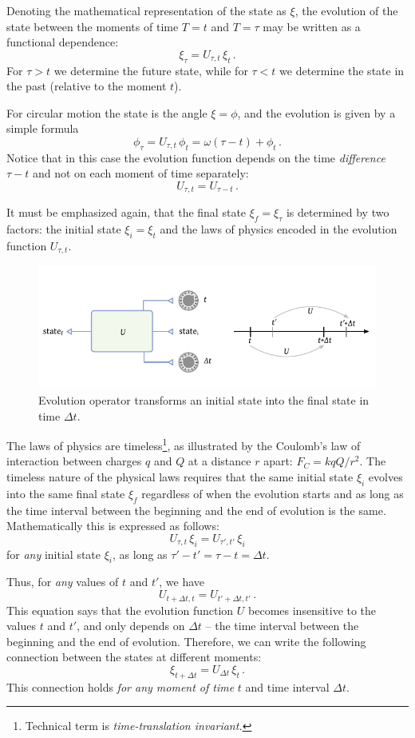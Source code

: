 Denoting the mathematical representation of the state as $\xi$, the evolution of the state between the moments of time $T=t$ and $T=\tau$ may be written as a functional dependence:
\[
\xi_\tau = U_{\tau, t}\,\xi_t\,.
\]
For $\tau > t$ we determine the future state, while for $\tau < t$ we determine the state in the past (relative to the moment $t$).
\begin{myExample}
	For circular motion the state is the angle $\xi=\phi$, and the evolution is given by a simple formula
	\[
	\phi_\tau = U_{\tau, t}\,\phi_t=\omega (\tau - t) + \phi_t\,.	
	\]
	Notice that in this case the evolution function depends on the time \emph{difference} $\tau-t$ and not on each moment of time separately:
	\[
	U_{\tau, t} = U_{\tau-t}\,.
	\]
\end{myExample}
It must be emphasized again, that the final state $\xi_f=\xi_\tau$ is determined by two factors: the initial state $\xi_i=\xi_t$ and the laws of physics encoded in the evolution function $U_{\tau, t}$. 

\begin{figure}[htbp]
	\centering
	\includegraphics[scale=1.0]{evolutionOperatorBox}
	\caption{Evolution operator transforms an initial state into the final state in time $\Delta t$.}
	\label{fig:evolutionOperatorBox}
\end{figure}

The laws of physics are timeless\footnote{Technical term is \emph{time-translation invariant.}}, as illustrated by the Coulomb's law of interaction between charges $q$ and $Q$ at a distance $r$ apart: $F_C=k qQ/r^2$. The timeless nature of the physical laws requires that the same initial state $\xi_i$ evolves into the same final state $\xi_f$ regardless of when the evolution starts and as long as the time interval between the beginning and the end of evolution is the same. Mathematically this is expressed as follows:
\[
U_{\tau, t}\,\xi_i  = U_{\tau', t'}\,\xi_i
\]
for \emph{any} initial state $\xi_i$, as long as $\tau'-t'=\tau-t=\Delta t$.

Thus, for \emph{any} values of $t$ and $t'$, we have
\[
U_{t+\Delta t, t}  = U_{t'+\Delta t, t'}\,.
\]
This equation says that the evolution function $U$ becomes insensitive to the values $t$ and $t'$, and only depends on $\Delta t$ -- the time interval between the beginning and the end of evolution. Therefore, we can write the following connection between the states at different moments:
\[
\xi_{t+\Delta t} = U_{\Delta t}\,\xi_t\,.
\]
This connection holds \emph{for any moment of time} $t$ and time interval $\Delta t$.

